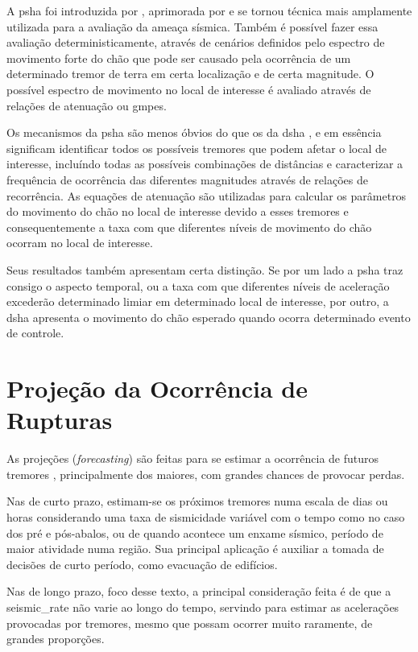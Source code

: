 A \glsdesc{psha} foi introduzida por \citet{cornell_1968}, aprimorada por \citet{mcguire_1976} e se tornou técnica mais
amplamente utilizada para a avaliação da ameaça sísmica. Também é possível fazer essa avaliação deterministicamente,
através de cenários definidos pelo espectro de movimento forte do chão que pode ser causado pela ocorrência de um
determinado tremor de terra em certa localização e de certa magnitude. O possível espectro de movimento no local de
interesse é avaliado através de relações de atenuação ou \glspl{gmpe}.

Os mecanismos da \gls{psha} \citep{bazzurro_1999, abrahamson_2006} são menos óbvios do que os da \gls{dsha}
\citep{reiter_1991, kramer_1996}, e em essência significam identificar todos os possíveis tremores que podem afetar o local de interesse,
incluíndo todas as possíveis combinações de distâncias e caracterizar a frequência de ocorrência das diferentes magnitudes através de relações de recorrência. As equações de
atenuação são utilizadas para calcular os parâmetros do movimento do chão no local de interesse devido a esses tremores
e consequentemente a taxa com que diferentes níveis de movimento do chão ocorram no local de interesse. 

Seus resultados também apresentam certa distinção. Se por um lado a \gls{psha} traz consigo o aspecto
temporal, ou a taxa com que diferentes níveis de aceleração excederão determinado limiar em determinado local de interesse,
por outro, a \gls{dsha} apresenta o movimento do chão esperado quando ocorra determinado evento de controle.


\section{Projeção da Ocorrência de Rupturas}
\label{sec:projecao}

As projeções (\textit{forecasting}) são feitas para se estimar a ocorrência de futuros tremores 
\citep{kagan_2000,marzocchi_2011}, principalmente dos maiores, com grandes chances de provocar perdas.

Nas de curto prazo, estimam-se os próximos tremores
numa escala de dias ou horas considerando uma taxa de sismicidade variável 
com o tempo como no caso dos pré e pós-abalos, ou de quando 
acontece um enxame sísmico, período de maior atividade numa região.
Sua principal aplicação é auxiliar a tomada de decisões de curto período, 
como evacuação de edifícios.

Nas de longo prazo, foco desse texto, a principal consideração feita é de que a 
\gls{seismic_rate} não varie ao longo do tempo, servindo para estimar as acelerações 
provocadas por tremores, mesmo que possam ocorrer
muito raramente, de grandes proporções. 

